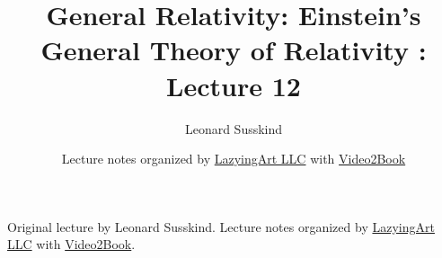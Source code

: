\documentclass[11pt,oneside]{book}
\begin{document}
\frontmatter
\title{General Relativity: Einstein's General Theory of Relativity : Lecture 12}
\author{Leonard Susskind}
\date{Lecture notes organized by \href{https://lazying.art}{LazyingArt LLC} with \href{https://github.com/lachlanchen/Video2Book}{Video2Book}}
\maketitle
\begin{center}
\small Original lecture by Leonard Susskind. Lecture notes organized by \href{https://lazying.art}{LazyingArt LLC} with \href{https://github.com/lachlanchen/Video2Book}{Video2Book}.
\end{center}
\clearpage
\mainmatter

\end{document}
